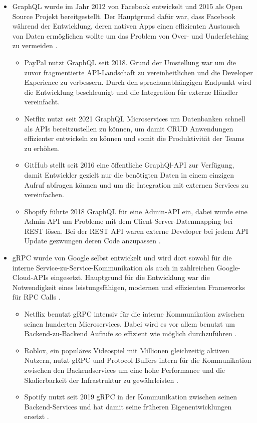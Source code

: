 \begin{itemize}
	\item GraphQL wurde im Jahr 2012 von Facebook entwickelt und 2015 als Open Source Projekt bereitgestellt. Der Hauptgrund dafür war, dass Facebook während der Entwicklung, deren nativen Apps einen effizienten Austausch von Daten ermöglichen wollte um das Problem von Over- und Underfetching zu vermeiden \parencite{graphql-org, amazon2025graphql}.
		\begin{itemize}
			\item PayPal nutzt GraphQL seit 2018. Grund der Umstellung war um die zuvor fragmentierte API-Landschaft zu vereinheitlichen und die Developer Experience zu verbessern. Durch den sprachunabhängigen Endpunkt wird die Entwicklung beschleunigt und die Integration für externe Händler vereinfacht. 
			\item Netflix nutzt seit 2021 GraphQL Microservices um Datenbanken schnell als APIs bereitzustellen zu können, um damit CRUD Anwendungen effizienter entwickeln zu können und somit die Produktivität der Teams zu erhöhen.
			\item GitHub stellt seit 2016 eine öffentliche GraphQl-API zur Verfügung, damit Entwickler gezielt nur die benötigten Daten in einem einzigen Aufruf abfragen können und um die Integration mit externen Services zu vereinfachen.
			\item Shopify führte 2018 GraphQL für eine Admin-API ein, dabei wurde eine Admin-API um Probleme mit dem Client-Server-Datenmapping bei REST lösen. Bei der REST API waren externe Developer bei jedem API Update gezwungen deren Code anzupassen \parencite{nordicapis-graphql-examples}.
		\end{itemize}
	\item gRPC wurde von Google selbst entwickelt und wird dort sowohl für die interne Service-zu-Service-Kommunikation als auch in zahlreichen Google-Cloud-APIs eingesetzt. Hauptgrund für die Entwicklung war die Notwendigkeit eines leistungsfähigen, modernen und effizienten Frameworks für RPC Calls \parencite{grpc-history}.
		\begin{itemize}
			\item Netflix benutzt gRPC intensiv für die interne Kommunikation zwischen seinen hunderten Microservices. Dabei wird es vor allem benutzt um Backend-zu-Backend Aufrufe so effizient wie möglich durchzuführen \parencite{netflix-protobuf}.
			\item Roblox, ein populäres Videospiel mit Millionen gleichzeitig aktiven Nutzern, nutzt gRPC und Protocol Buffers intern für die Kommunikation zwischen den Backendservices um eine hohe Performance und die Skalierbarkeit der Infrastruktur zu gewährleisten \parencite{roblox-analytics}.
			\item Spotify nutzt seit 2019 gRPC in der Kommunikation zwischen seinen Backend-Services und hat damit seine früheren Eigenentwicklungen ersetzt \parencite{spotify-k8s-case}.
		\end{itemize}
\end{itemize}

